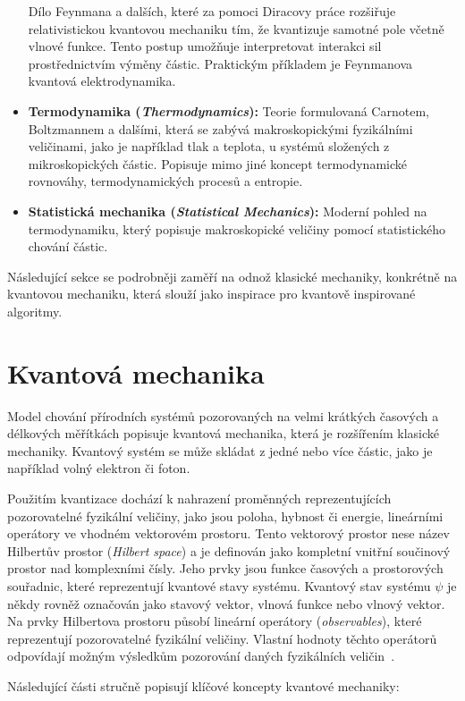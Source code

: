 \begin{itemize}
    Dílo Feynmana a dalších, které za pomoci Diracovy práce rozšiřuje relativistickou kvantovou mechaniku tím, že kvantizuje samotné pole včetně vlnové funkce. 
    Tento postup umožňuje interpretovat interakci sil prostřednictvím výměny částic. 
    Praktickým příkladem je Feynmanova kvantová elektrodynamika. 
    \item \textbf{Termodynamika (\emph{Thermodynamics}):} 
    Teorie formulovaná Carnotem, Boltzmannem a dalšími, která se zabývá makroskopickými fyzikálními veličinami, jako je například tlak a teplota, u systémů složených z mikroskopických částic. 
    Popisuje mimo jiné koncept termodynamické rovnováhy, termodynamických procesů a entropie. 
    \item \textbf{Statistická mechanika (\emph{Statistical Mechanics}):} 
    Moderní pohled na termodynamiku, který popisuje makroskopické veličiny pomocí statistického chování částic.
\end{itemize}

Následující sekce se podrobněji zaměří na odnož klasické mechaniky, konkrétně na kvantovou mechaniku, která slouží jako inspirace pro kvantově inspirované algoritmy.

\section{Kvantová mechanika}
Model chování přírodních systémů pozorovaných na velmi krátkých časových a délkových měřítkách popisuje kvantová mechanika, která je rozšířením klasické mechaniky. 
Kvantový systém se může skládat z jedné nebo více částic, jako je například volný elektron či foton. 

Použitím kvantizace dochází k nahrazení proměnných reprezentujících pozorovatelné fyzikální veličiny, jako jsou poloha, hybnost či energie, lineárními operátory ve vhodném vektorovém prostoru. 
Tento vektorový prostor nese název Hilbertův prostor (\emph{Hilbert space}) a je definován jako kompletní vnitřní součinový prostor nad komplexními čísly. 
Jeho prvky jsou funkce časových a prostorových souřadnic, které reprezentují kvantové stavy systému. 
Kvantový stav systému $\psi$ je někdy rovněž označován jako stavový vektor, vlnová funkce nebo vlnový vektor. 
Na prvky Hilbertova prostoru působí lineární operátory (\emph{observables}), které reprezentují pozorovatelné fyzikální veličiny. 
Vlastní hodnoty těchto operátorů odpovídají možným výsledkům pozorování daných fyzikálních veličin~\cite{NaturalComputing}.

Následující části stručně popisují klíčové koncepty kvantové mechaniky:

